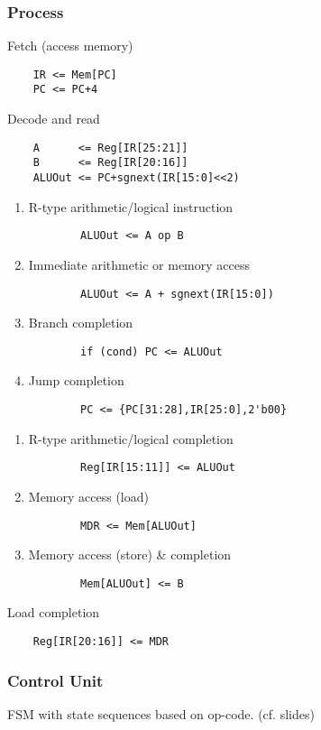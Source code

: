 \documentclass{article}
\begin{document}
\subsubsection{Process}
 Fetch (access memory)
\begin{verbatim}
	IR <= Mem[PC]
	PC <= PC+4
\end{verbatim}
 Decode and read
\begin{verbatim}
	A      <= Reg[IR[25:21]]
	B      <= Reg[IR[20:16]]
	ALUOut <= PC+sgnext(IR[15:0]<<2)
\end{verbatim}
\begin{enumerate}
	\item R-type arithmetic/logical instruction \begin{verbatim}
		ALUOut <= A op B
	\end{verbatim}
	\item Immediate arithmetic or memory access \begin{verbatim}
		ALUOut <= A + sgnext(IR[15:0])
	\end{verbatim}
	\item Branch completion \begin{verbatim}
		if (cond) PC <= ALUOut
	\end{verbatim}
	\item Jump completion \begin{verbatim}
		PC <= {PC[31:28],IR[25:0],2'b00}
	\end{verbatim}
\end{enumerate}
\begin{enumerate}
	\item R-type arithmetic/logical completion \begin{verbatim}
		Reg[IR[15:11]] <= ALUOut
	\end{verbatim}
	\item Memory access (load) \begin{verbatim}
		MDR <= Mem[ALUOut]
	\end{verbatim}
	\item Memory access (store) \& completion \begin{verbatim}
		Mem[ALUOut] <= B
	\end{verbatim}
\end{enumerate}
 Load completion
\begin{verbatim}
	Reg[IR[20:16]] <= MDR
\end{verbatim}
\subsubsection{Control Unit}
FSM with state sequences based on op-code. (cf. slides)
\end{document}
